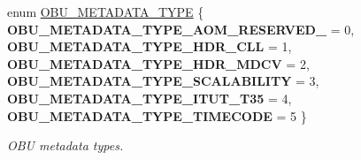 \begin{DoxyCompactItemize}
\item 
\mbox{\label{group__codec_gaaeb1643131595e752f0c823cbca1c8cb}} 
enum \hyperlink{group__codec_gaaeb1643131595e752f0c823cbca1c8cb}{O\+B\+U\+\_\+\+M\+E\+T\+A\+D\+A\+T\+A\+\_\+\+T\+Y\+PE} \{ \newline
{\bfseries O\+B\+U\+\_\+\+M\+E\+T\+A\+D\+A\+T\+A\+\_\+\+T\+Y\+P\+E\+\_\+\+A\+O\+M\+\_\+\+R\+E\+S\+E\+R\+V\+E\+D\+\_} = 0, 
{\bfseries O\+B\+U\+\_\+\+M\+E\+T\+A\+D\+A\+T\+A\+\_\+\+T\+Y\+P\+E\+\_\+\+H\+D\+R\+\_\+\+C\+LL} = 1, 
{\bfseries O\+B\+U\+\_\+\+M\+E\+T\+A\+D\+A\+T\+A\+\_\+\+T\+Y\+P\+E\+\_\+\+H\+D\+R\+\_\+\+M\+D\+CV} = 2, 
{\bfseries O\+B\+U\+\_\+\+M\+E\+T\+A\+D\+A\+T\+A\+\_\+\+T\+Y\+P\+E\+\_\+\+S\+C\+A\+L\+A\+B\+I\+L\+I\+TY} = 3, 
\newline
{\bfseries O\+B\+U\+\_\+\+M\+E\+T\+A\+D\+A\+T\+A\+\_\+\+T\+Y\+P\+E\+\_\+\+I\+T\+U\+T\+\_\+\+T35} = 4, 
{\bfseries O\+B\+U\+\_\+\+M\+E\+T\+A\+D\+A\+T\+A\+\_\+\+T\+Y\+P\+E\+\_\+\+T\+I\+M\+E\+C\+O\+DE} = 5
 \}\begin{DoxyCompactList}\small\item\em O\+BU metadata types. \end{DoxyCompactList}
\end{DoxyCompactItemize}
